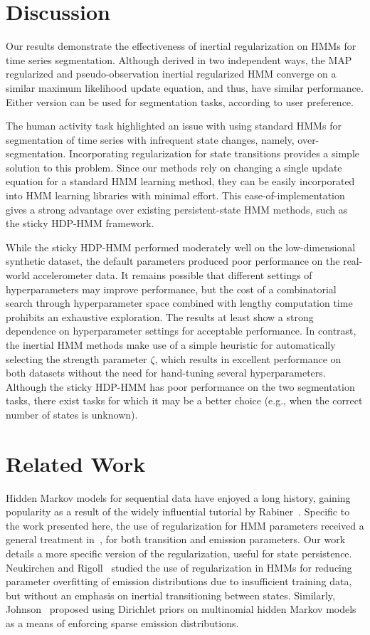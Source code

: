 \documentclass[letterpaper]{article}
\begin{document}
\section{Discussion}

Our results demonstrate the effectiveness of inertial regularization on HMMs for
time series segmentation. Although derived in two independent ways, the MAP
regularized and pseudo-observation inertial regularized HMM converge on a
similar maximum likelihood update equation, and thus, have similar performance.
Either version can be used for segmentation tasks, according to user preference.

The human activity task highlighted an issue with using standard HMMs for
segmentation of time series with infrequent state changes, namely,
over-segmentation. Incorporating regularization for state transitions provides a
simple solution to this problem. Since our methods rely on changing a single
update equation for a standard HMM learning method, they can be easily
incorporated into HMM learning libraries with minimal effort. This
ease-of-implementation gives a strong advantage over existing persistent-state
HMM methods, such as the sticky HDP-HMM framework.

While the sticky HDP-HMM performed moderately well on the low-dimensional
synthetic dataset, the default parameters produced poor performance on the
real-world accelerometer data. It remains possible that different settings of
hyperparameters may improve performance, but the cost of a combinatorial search
through hyperparameter space combined with lengthy computation time prohibits an exhaustive 
exploration. The results at least show a strong dependence on hyperparameter settings for 
acceptable performance. In contrast, the inertial HMM methods make use of a simple heuristic for 
automatically selecting the strength parameter $\zeta$, which results in excellent performance on 
both datasets without the need for hand-tuning several hyperparameters. Although the sticky HDP-HMM 
has poor performance on the two segmentation tasks, there exist tasks for which it may be a better 
choice (e.g., when the correct number of states is unknown).

\section{Related Work}

Hidden Markov models for sequential data have enjoyed a long history, gaining
popularity as a result of the widely influential tutorial by
Rabiner~\cite{rabiner1989tutorial}. Specific to the work presented here, the use
of regularization for HMM parameters received a general treatment
in~\cite{MAP1994}, for both transition and emission parameters. Our work details
a more specific version of the regularization, useful for state persistence.
Neukirchen and Rigoll~\cite{neukirchen1999controlling} studied the use of
regularization in HMMs for reducing parameter overfitting of emission
distributions due to insufficient training data, but without an emphasis on
inertial transitioning between states. Similarly,
Johnson~\cite{Johnson07whydoesnt} proposed using Dirichlet priors on multinomial
hidden Markov models as a means of enforcing sparse emission distributions.
\end{document}
